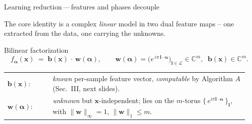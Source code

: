 \documentclass[aspectratio=169,11pt,xcolor={dvipsnames,table}]{beamer}
\newcommand{\Complex}{\mathbb{C}}
\newcommand{\Lspace}{\mathcal{L}}
\renewcommand{\vec}[1]{\bm{#1}}
\newcommand{\xvec}{\vec x}
\newcommand{\avec}{\vec\alpha}
\newcommand{\wvec}{\vec w}
\newcommand{\bvec}{\vec b}
\theoremstyle{definition}
\begin{document}
\begin{frame}{Learning reduction\,---\,features and phases decouple}

  \footnotesize
  The core identity is a complex \emph{linear} model in two dual
  feature maps -- one extracted from the data, one carrying the unknowns.

  \begin{block}{\small Bilinear factorization}
    \scriptsize
    \[
        f_{\avec}(\xvec)\;=\;\bvec(\xvec)\,\cdot\,\wvec(\avec),
        \qquad
        \wvec(\avec)=\bigl(e^{\,i\pi\,\vec l\cdot\avec}\bigr)_{\vec l\in\Lspace}\!
            \in\Complex^{m},\;\;
        \bvec(\xvec)\in\Complex^{m}.
    \]
    \begin{tabular}{@{}p{0.18\linewidth}@{\;}p{0.78\linewidth}@{}}
      \(\bvec(\xvec)\): & \emph{known} per-sample feature vector,
                          \emph{computable} by Algorithm \(A\)
                          (Sec.~III, next slides).\\
      \(\wvec(\avec)\): & \emph{unknown} but \(\xvec\)-independent;
                          lies on the \(m\)-torus
                          \(\bigl\{\,e^{i\pi\vec l\cdot\avec}\,\bigr\}_{\vec l}\),
                          with \(\|\wvec\|_\infty=1\), \(\|\wvec\|_1\le m\).
    \end{tabular}
  \end{block}


\end{frame}
\end{document}
